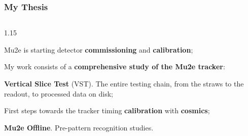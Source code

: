 \documentclass{beamer}
\begin{document}
\begin{frame}
    \frametitle{My Thesis}
    
\begin{columns}
   \begin{column}{1.15\framewidth} 
         \setlength{\leftmargini}{1.3em}
\vspace{-4mm}
\begin{itemize}
    {\footnotesize \item Mu2e is starting detector \textbf{commissioning} and \textbf{calibration};}
     \vspace{9mm}
     {\footnotesize \item My work consists of a \textbf{comprehensive study of the Mu2e tracker}:}
\vspace{9mm}
  \begin{itemize}
    {\footnotesize \item \textbf{Vertical Slice Test} (VST). The entire 
testing chain, from the straws to the readout, to processed data on disk;}

     \vspace{9mm}

     {\footnotesize \item First steps towards the tracker timing \textbf{calibration} with \textbf{cosmics};}
   
         \vspace{9mm}

         {\footnotesize \item \textbf{Mu2e Offline}. Pre-pattern recognition studies.}
        
        \end{itemize}
\end{itemize}
 \end{column}
 \end{columns}
     

\end{frame}
\end{document}
